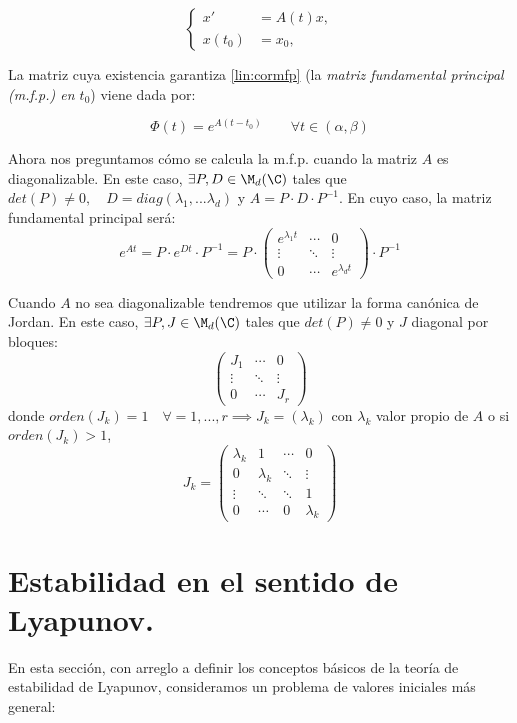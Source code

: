 \begin{equation}
\left\{\begin{array}{rl}
x' &=A(t)x, \\
x(t_0)&=x_0,
\end{array}\right.
\tag{PVIH} \label{lin:PVIH}
\end{equation}

La matriz cuya existencia garantiza \ref{lin:cormfp} (la \emph{matriz fundamental principal (m.f.p.) en $t_0$}) viene dada por:

\[ \Phi(t)=e^{A(t-t_0)} \qquad \forall t \in (\alpha,\beta) \]

Ahora nos preguntamos cómo se calcula la m.f.p. cuando la matriz $A$ es diagonalizable. En este caso, $\exists P, D \in \M_d(\C)$ tales que $det(P)\neq 0, \quad D=diag(\lambda_1,...\lambda_d)$ y $A=P\cdot D \cdot P^{-1}$. En cuyo caso, la matriz fundamental principal será:
$$e^{At}=P\cdot e^{Dt}\cdot P^{-1}=P \cdot  \begin{pmatrix}e^{\lambda_1 t} & \cdots & 0 \\ \vdots & \ddots & \vdots \\0 & \cdots & e^{\lambda_d t}\end{pmatrix} \cdot P^{-1}$$


Cuando $A$ no sea diagonalizable tendremos que utilizar la forma canónica de Jordan. En este caso, $\exists P,J\in \M_d(\C)$ tales que $det(P) \neq 0 $ y $J$ diagonal por bloques:
$$\begin{pmatrix}J_1 & \cdots & 0\\
 \vdots & \ddots & \vdots \\
 0& \cdots & J_r \end{pmatrix}$$
 donde $orden(J_k)=1 \quad \forall =1,...,r \implies J_k=(\lambda_k)$ con $\lambda_k$ valor propio de $A$ o si $orden(J_k)>1$,
 $$J_k=
 \begin{pmatrix}
 \lambda_k & 1  &\cdots & 0 \\
  0 & \lambda_k & \ddots & \vdots \\
  \vdots & \ddots & \ddots & 1 \\
  0 & \cdots & 0 & \lambda_k
\end{pmatrix}$$


\section{Estabilidad en el sentido de Lyapunov.}

En esta sección, con arreglo a definir los conceptos básicos de la teoría de estabilidad
de Lyapunov, consideramos un problema de valores iniciales más general:

